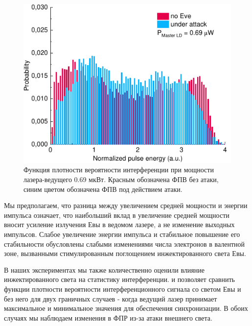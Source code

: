 \begin{figure}
	\includegraphics[width=\linewidth]{images/hist_attack_01.pdf}
	\caption{Функция плотности вероятности интерференции при мощности лазера-ведущего 0.69 мкВт. Красным обозначена ФПВ без атаки, синим цветом обозначена ФПВ под действием атаки.}
\end{figure}
\label{fig:histogram_min}

Мы предполагаем, что разница между увеличением средней мощности и энергии импульса означает, что наибольший вклад в увеличение средней мощности вносит усиление излучения Евы в ведомом лазере, а не изменение выходных импульсов. Слабое увеличение энергии импульса и стабильное повышение его стабильности обусловлены слабыми изменениями числа электронов в валентной зоне, вызванными стимулированным поглощением инжектированного света Евы. 

В наших экспериментах мы также количественно оценили влияние инжектированного света на статистику интерференции.  и  позволяет сравнить функции плотности вероятности интерференционного сигнала со светом Евы и без него для двух граничных случаев - когда ведущий лазер принимает максимальное и минимальное значения для обеспечения синхронизации. В обоих случаях мы наблюдаем изменения в ФПР из-за атаки внешнего света.

